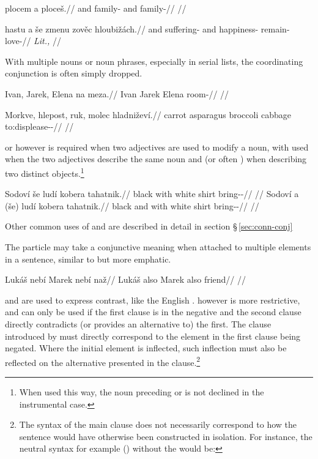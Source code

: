 \pex
\begingl
     plocem {a} ploceš.//
    \glb and family-\First{}\Sg{} and family-//
    \glft {}//
\endgl
\xe

\pex
\begingl
     hastu {a} še zmenu zověc hloubižách.//
    \glb and suffering-\mk{} and \Com{} happiness-\Ins{} remain-\Cv{} love-//
    \glft {} \emph{Lit.,} //
\endgl
\xe

With multiple nouns or noun phrases, especially in serial lists, the
coordinating conjunction is often simply dropped.

\pex
\begingl
    \gla Ivan, Jarek, Elena na meza.//
    \glb Ivan Jarek Elena \Loc{} room-\Acc{}//
    \glft {}//
\endgl
\xe

\pex
\begingl
    \gla Morkve, hlepost, ruk, molec hladniževí.//
    \glb carrot asparagus broccoli cabbage to:displease-\Av{}-\Cont{}//
    \glft {}//
\endgl
\xe

 or  however is required when two adjectives are used to modify a
noun, with  used when the two adjectives describe the same noun and
 (or often ) when describing two distinct
objects.\footnote{When used this way, the noun preceding  or 
is not declined in the instrumental case.}

\pex
\a
\begingl
    \gla Sodoví {še} ludí kobera tahatnik.//
    \glb black with white shirt bring-\Pv{}-\Pf{}//
    \glft {}//
\endgl
\a
\begingl
    \gla Sodoví {a} {(še)} ludí kobera tahatnik.//
    \glb black and with white shirt bring-\Pv{}-\Pf{}//
    \glft {}//
\endgl
\xe

Other common uses of  and  are described in detail in section
\S\,\ref{sec:conn-conj}

The particle  may take a conjunctive meaning when attached to
multiple elements in a sentence, similar to  but more emphatic.

\pex
\begingl
    \gla Lukáš nebí Marek nebí naž//
    \glb Lukáš also Marek also friend//
    \glft {}//
\endgl
\xe

 and  are used to express contrast, like the English
.  however is more restrictive, and can only be used if the
first clause is in the negative and the second clause directly contradicts (or
provides an alternative to) the first. The clause introduced by  must
directly correspond to the element in the first clause being negated. Where the
initial element is inflected, such inflection must also be reflected on the
alternative presented in the  clause.\footnote{The syntax of the main
clause does not necessarily correspond to how the sentence would have otherwise
been constructed in isolation. For instance, the neutral syntax for example
() without the  would be: }

